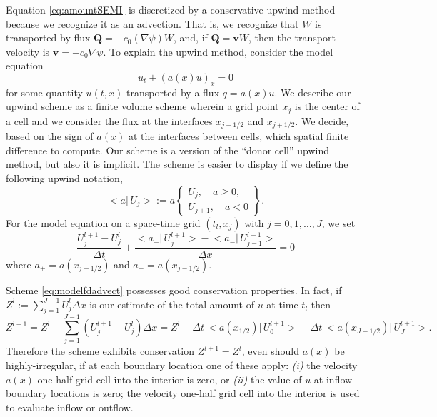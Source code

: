 \documentclass[11pt]{amsart}
\newcommand{\bQ}{\mathbf{Q}}
\newcommand{\bv}{\mathbf{v}}
\begin{document}
Equation \eqref{eq:amountSEMI} is discretized by a conservative upwind method because we recognize it as an advection.  That is, we recognize that $W$ is transported by flux $\bQ=- c_0 (\nabla \psi) W$, and, if $\bQ = \bv W$, then the transport velocity is $\bv = - c_0 \nabla \psi$.  To explain the upwind method, consider the model equation
\begin{equation}\label{eq:modeladvect}
u_t + (a(x) u)_x = 0
\end{equation}
for some quantity $u(t,x)$ transported by a flux $q = a(x) u$.  We describe our upwind scheme as a finite volume scheme \citep{LeVeque} wherein a grid point $x_j$ is the center of a cell and we consider the flux at the interfaces $x_{j-1/2}$ and $x_{j+1/2}$.  We decide, based on the sign of $a(x)$ at the interfaces between cells, which spatial finite difference to compute.  Our scheme is a version of the ``donor cell'' upwind method, but also it is implicit.  The scheme is easier to display if we define the following upwind notation,
\newcommand{\up}[2]{\big<#1\big|\,#2\big>}
	$$\up{a}{U_j} := a \begin{Bmatrix} U_j, \quad a \ge 0, \\ U_{j+1}, \quad a< 0 \end{Bmatrix}.$$
For the model equation on a space-time grid $(t_l,x_j)$ with $j=0,1,\dots,J$, we set
\begin{equation}\label{eq:modelfdadvect}
\frac{U_j^{l+1} - U_j^l}{\Delta t} + \frac{\up{a_+}{U_j^{l+1}} - \up{a_-}{U_{j-1}^{l+1}}}{\Delta x} = 0
\end{equation}
where $a_+ = a(x_{j+1/2})$ and $a_-=a(x_{j-1/2})$.

Scheme \eqref{eq:modelfdadvect} possesses good conservation properties.  In fact, if $Z^l := \sum_{j=1}^{J-1} U_j^l \Delta x$ is our estimate of the total amount of $u$ at time $t_l$ then
    $$Z^{l+1} = Z^l + \sum_{j=1}^{J-1} (U_j^{l+1} - U_j^l) \Delta x = Z^l + \Delta t \, \up{a(x_{1/2})}{U_0^{l+1}} - \Delta t\, \up{a(x_{J-1/2})}{U_J^{l+1}}.$$
Therefore the scheme exhibits conservation $Z^{l+1}=Z^l$, even should $a(x)$ be highly-irregular, if at each boundary location one of these apply:  \emph{(i)} the velocity $a(x)$ one half grid cell into the interior is zero, or \emph{(ii)} the value of $u$ at inflow boundary locations is zero; the velocity one-half grid cell into the interior is used to evaluate inflow or outflow.
\end{document}
